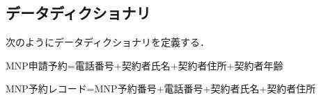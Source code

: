 \documentclass[uplatex]{jsarticle}
\begin{document}
\subsection{データディクショナリ}
次のようにデータディクショナリを定義する．

MNP申請予約=電話番号+契約者氏名+契約者住所+契約者年齢

MNP予約レコード=MNP予約番号+電話番号+契約者氏名+契約者住所
\end{document}
